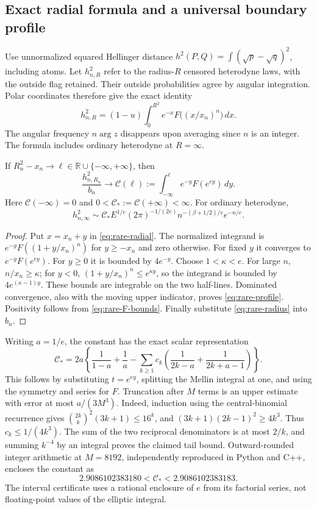 \subsection{Exact radial formula and a universal boundary profile}
Use unnormalized squared Hellinger distance
$h^2(P,Q)=\int(\sqrt p-\sqrt q)^2$, including atoms.
Let $h_{n,R}^2$ refer to the radius-$R$ censored heterodyne laws, with the
outside flag retained. Their outside probabilities agree by angular
integration. Polar coordinates therefore give the exact identity
\[
 \boxed{h_{n,R}^2=(1-u)\int_0^{R^2}e^{-x}
                           F\bigl((x/x_n)^n\bigr)\,dx.}
 \tag{C.7}\label{eq:rare-radial}
\]
The angular frequency $n\arg z$ disappears upon averaging since $n$ is an
integer. The formula includes ordinary heterodyne at $R=\infty$.

\begin{theorem}\label{thm:rare-profile}
If $R_n^2-x_n\to\ell\in\mathbb R\cup\{-\infty,+\infty\}$, then
\[
 \frac{h_{n,R_n}^2}{b_n}\longrightarrow
 \mathcal C(\ell):=\int_{-\infty}^{\ell}e^{-y}F(e^{ey})\,dy.
 \tag{C.8}\label{eq:rare-profile}
\]
Here $\mathcal C(-\infty)=0$ and $0<\mathcal C_*:=\mathcal C(+\infty)<\infty$.
For ordinary heterodyne,
\[
 h_{n,\infty}^2\sim\mathcal C_* E^{1/e}(2\pi)^{-1/(2e)}
 n^{-(\beta+1/2)/e}e^{-n/e}.
 \tag{C.9}\label{eq:rare-sharp}
\]
\end{theorem}
\begin{proof}
Put $x=x_n+y$ in \eqref{eq:rare-radial}. The normalized integrand is
$e^{-y}F((1+y/x_n)^n)$ for $y\ge-x_n$ and zero otherwise.
For fixed $y$ it converges to $e^{-y}F(e^{ey})$.
For $y\ge0$ it is bounded by $4e^{-y}$.
Choose $1<\kappa<e$. For large $n$, $n/x_n\ge\kappa$; for $y<0$,
$(1+y/x_n)^n\le e^{\kappa y}$, so the integrand is bounded by
$4e^{(\kappa-1)y}$. These bounds are integrable on the two half-lines.
Dominated convergence, also with the moving upper indicator, proves
\eqref{eq:rare-profile}. Positivity follows from \eqref{eq:rare-F-bounds}.
Finally substitute \eqref{eq:rare-radius} into $b_n$.
\end{proof}

Writing $a=1/e$, the constant has the exact scalar representation
\[
 \mathcal C_*=2a\left\{\frac1{1-a}+\frac1a-
 \sum_{k\ge1}c_k\left(\frac1{2k-a}+\frac1{2k+a-1}\right)\right\}.
 \tag{C.10}\label{eq:rare-constant}
\]
This follows by substituting $t=e^{ey}$, splitting the Mellin integral at
one, and using the symmetry and series for $F$.
Truncation after $M$ terms is an upper estimate with error at most
$a/(3M^3)$. Indeed, induction using the central-binomial recurrence gives
$\binom{2k}{k}^2(3k+1)\le16^k$, and
$(3k+1)(2k-1)^2\ge4k^3$. Thus $c_k\le1/(4k^3)$.
The sum of the two reciprocal denominators is at most $2/k$, and summing
$k^{-4}$ by an integral proves the claimed tail bound.
Outward-rounded integer arithmetic at $M=8192$, independently reproduced
in Python and C++, encloses the constant as
\[
 2.9086102383180<\mathcal C_*<2.9086102383183.
 \tag{C.11}\label{eq:rare-constant-enclosure}
\]
The interval certificate uses a rational enclosure of $e$ from its factorial
series, not floating-point values of the elliptic integral.

